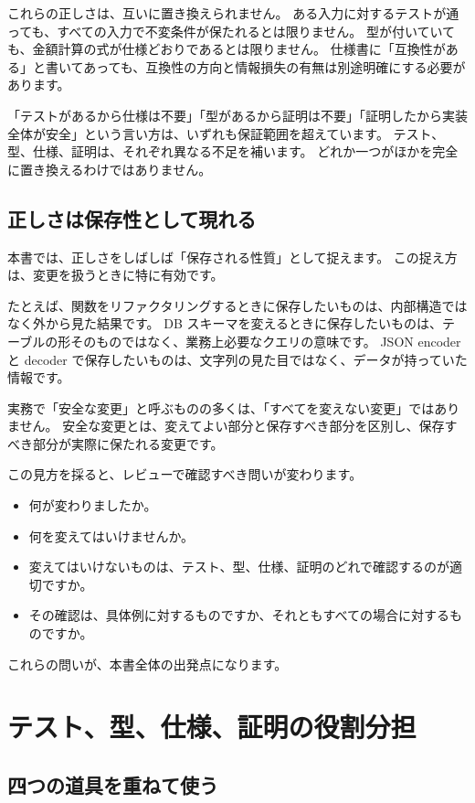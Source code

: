 これらの正しさは、互いに置き換えられません。
ある入力に対するテストが通っても、すべての入力で不変条件が保たれるとは限りません。
型が付いていても、金額計算の式が仕様どおりであるとは限りません。
仕様書に「互換性がある」と書いてあっても、互換性の方向と情報損失の有無は別途明確にする必要があります。

「テストがあるから仕様は不要」「型があるから証明は不要」「証明したから実装全体が安全」という言い方は、いずれも保証範囲を超えています。
テスト、型、仕様、証明は、それぞれ異なる不足を補います。
どれか一つがほかを完全に置き換えるわけではありません。

\subsection{正しさは保存性として現れる}

本書では、正しさをしばしば「保存される性質」として捉えます。
この捉え方は、変更を扱うときに特に有効です。

たとえば、関数をリファクタリングするときに保存したいものは、内部構造ではなく外から見た結果です。
DB スキーマを変えるときに保存したいものは、テーブルの形そのものではなく、業務上必要なクエリの意味です。
JSON encoder と decoder で保存したいものは、文字列の見た目ではなく、データが持っていた情報です。

実務で「安全な変更」と呼ぶものの多くは、「すべてを変えない変更」ではありません。
安全な変更とは、変えてよい部分と保存すべき部分を区別し、保存すべき部分が実際に保たれる変更です。

この見方を採ると、レビューで確認すべき問いが変わります。

\begin{itemize}
\item 何が変わりましたか。
\item 何を変えてはいけませんか。
\item 変えてはいけないものは、テスト、型、仕様、証明のどれで確認するのが適切ですか。
\item その確認は、具体例に対するものですか、それともすべての場合に対するものですか。
\end{itemize}

これらの問いが、本書全体の出発点になります。

\section{テスト、型、仕様、証明の役割分担}
\label{sec:ch00-test-type-spec-proof}

\subsection{四つの道具を重ねて使う}

